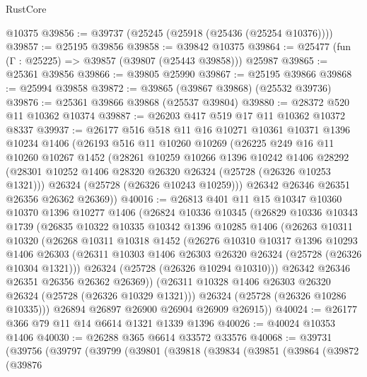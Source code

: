 \begin{lexlean}{RustCore}
\begin{coremodule}
    @10375
@39856 := @39737 (@25245 (@25918 (@25436 (@25254 @10376))))
@39857 := @25195 @39856
@39858 := @39842 @10375
@39864 := @25477 (fun (Γ : @25225) => @39857 (@39807 (@25443 @39858))) @25987
@39865 := @25361 @39856
@39866 := @39805 @25990
@39867 := @25195 @39866
@39868 := @25994 @39858
@39872 := @39865 (@39867 @39868) (@25532 @39736)
@39876 := @25361 @39866 @39868 (@25537 @39804)
@39880 := @28372 @520 @11 @10362 @10374
@39887 := @26203 @417 @519 @17 @11 @10362 @10372 @8337
@39937 := @26177
    @516
    @518
    @11
    @16
    @10271
    @10361
    @10371
    @1396
    @10234
    @1406
    (@26193
      @516
      @11
      @10260
      @10269
      (@26225
        @249
        @16
        @11
        @10260
        @10267
        @1452
        (@28261
          @10259
          @10266
          @1396
          @10242
          @1406
          @28292
          (@28301 @10252 @1406 @28320 @26320 @26324 (@25728 (@26326 @10253 @1321)))
          @26324
          (@25728 (@26326 @10243 @10259)))
        @26342
        @26346
        @26351
        @26356
        @26362
        @26369))
@40016 := @26813
    @401
    @11
    @15
    @10347
    @10360
    @10370
    @1396
    @10277
    @1406
    (@26824
      @10336
      @10345
      (@26829
        @10336
        @10343
        @1739
        (@26835
          @10322
          @10335
          @10342
          @1396
          @10285
          @1406
          (@26263
            @10311
            @10320
            (@26268
              @10311
              @10318
              @1452
              (@26276
                @10310
                @10317
                @1396
                @10293
                @1406
                @26303
                (@26311 @10303 @1406 @26303 @26320 @26324 (@25728 (@26326 @10304 @1321)))
                @26324
                (@25728 (@26326 @10294 @10310)))
              @26342
              @26346
              @26351
              @26356
              @26362
              @26369))
          (@26311 @10328 @1406 @26303 @26320 @26324 (@25728 (@26326 @10329 @1321)))
          @26324
          (@25728 (@26326 @10286 @10335)))
        @26894
        @26897
        @26900
        @26904
        @26909
        @26915))
@40024 := @26177 @366 @79 @11 @14 @6614 @1321 @1339 @1396
@40026 := @40024 @10353 @1406
@40030 := @26288 @365 @6614 @33572 @33576
@40068 := @39731
    (@39756
      (@39797
        (@39799
          (@39801
            (@39818
              (@39834
                (@39851
                  (@39864
                    (@39872
                      (@39876

\end{coremodule}
\end{lexlean}

